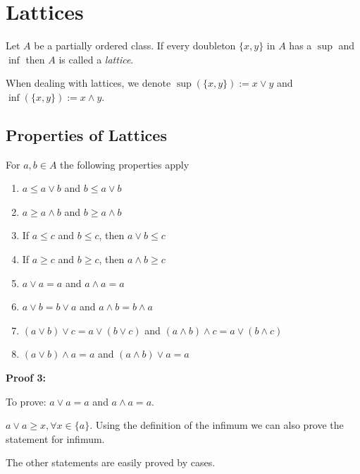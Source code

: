 \section{Lattices}

Let \(A\) be a partially ordered class. If every doubleton \(\{x, y\}\) in \(A\) has a
\(\sup\) and \(\inf\) then \(A\) is called a \emph{lattice}.

When dealing with lattices, we denote \(\sup(\{x, y\}):= x \lor y\) and \(\inf(\{x, y\}) := x \land y\).

\subsection{Properties of Lattices}

For \(a, b \in A\) the following properties apply

\begin{enumerate}

	\item \(a \le a \lor b\) and \(b \le a \lor b\)

	\item \(a \ge a \land b\) and \(b \ge a \land b\)

	\item If \(a \le c\) and \(b \le c\), then \(a \lor b \le c\)

	\item If \(a \ge c\) and \(b \ge c\), then \(a \land b \ge c\)

	\item \(a \lor a = a\) and \(a \land a = a\)

	\item \(a \lor b = b \lor a\) and \(a \land b = b \land a\)

	\item \((a \lor b) \lor c = a \lor (b \lor c)\) and \((a \land b) \land c = a \lor (b \land c)\)

	\item \((a \lor b) \land a = a\) and \((a \land b) \lor a = a\)

\end{enumerate}

\textbf{Proof 3:}

To prove: \(a \lor a = a\) and \(a \land a = a\).

\(a \lor a \ge x, \forall x \in \{a\}\). Using the definition of the infimum we can also prove
the statement for infimum.

The other statements are easily proved by cases.

